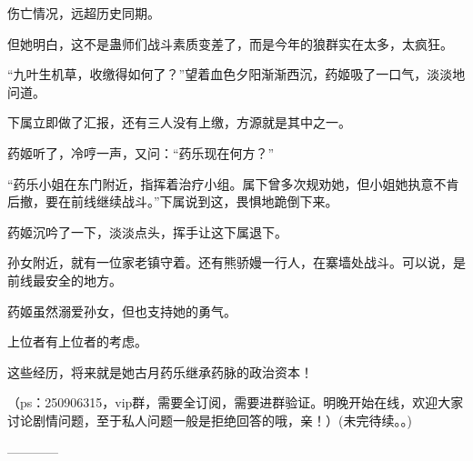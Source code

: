 \begin{this_body}
伤亡情况，远超历史同期。

但她明白，这不是蛊师们战斗素质变差了，而是今年的狼群实在太多，太疯狂。

“九叶生机草，收缴得如何了？”望着血色夕阳渐渐西沉，药姬吸了一口气，淡淡地问道。

下属立即做了汇报，还有三人没有上缴，方源就是其中之一。

药姬听了，冷哼一声，又问：“药乐现在何方？”

“药乐小姐在东门附近，指挥着治疗小组。属下曾多次规劝她，但小姐她执意不肯后撤，要在前线继续战斗。”下属说到这，畏惧地跪倒下来。

药姬沉吟了一下，淡淡点头，挥手让这下属退下。

孙女附近，就有一位家老镇守着。还有熊骄嫚一行人，在寨墙处战斗。可以说，是前线最安全的地方。

药姬虽然溺爱孙女，但也支持她的勇气。

上位者有上位者的考虑。

这些经历，将来就是她古月药乐继承药脉的政治资本！

（ps：250906315，vip群，需要全订阅，需要进群验证。明晚开始在线，欢迎大家讨论剧情问题，至于私人问题一般是拒绝回答的哦，亲！）(未完待续。。)

------------

\end{this_body}


